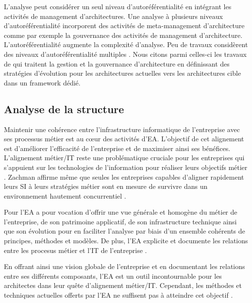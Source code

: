L'analyse peut considérer un seul niveau d'autoréférentialité en intégrant les
activités de management d'architectures. Une analyse à plusieurs niveaux
d'autoréférentialité incorporent des activités de meta-management
d'architecture comme par exemple la gouvernance des activités de management
d'architecture.  L'autoréférentialité augmente la complexité d'analyse. Peu de
travaux considèrent des niveaux d'autoréférentialité multiples
\cite{smook2014executable}. Nous citons parmi celles-ci les travaux de
\cite{metrailler_evolis_2014} qui traitent la gestion et la gouvernance
d'architecture en définissant des stratégies d'évolution pour les architectures
actuelles vers les architectures cible dans un framework dédié. 


\subsection{Analyse de la structure}

Maintenir une cohérence entre l'infrastructure informatique de l'entreprise
avec ses processus métier est au cœur des activités
d'EA\cite{lankhorst2013enterprise}. L'objectif de cet alignement est
d'améliorer l'efficacité de l'entreprise et de maximiser ainsi ses bénéfices.
L'alignement métier/IT reste une problématique cruciale pour les entreprises
qui s'appuient sur les technologies de l'information pour réaliser leurs
objectifs métier \cite{kaisler_enterprise_2005}. Zachman affirme même que
seules les entreprises capables d'aligner rapidement leurs SI à leurs
stratégies métier sont en mesure de survivre dans un environnement hautement
concurrentiel \cite{zachman1997enterprise}.
	
Pour \cite{lankhorst2013enterprise} l'EA a pour vocation d'offrir une vue
générale et homogène du métier de l'entreprise, de son patrimoine applicatif,
de son infrastructure technique ainsi que son évolution pour en faciliter
l'analyse par biais d'un ensemble cohérents de principes, méthodes et modèles.
De plus, l'EA explicite et documente les relations entre les procesus métier et
l'IT de l'entreprise \cite{kaisler_enterprise_2005}. 
	
En offrant ainsi une vision globale de l'entreprise et en documentant les
relations entre ses différents composants, l'EA est un outil incontournable
pour les architectes dans leur quête d'alignement métier/IT. Cependant, les
méthodes et techniques actuelles offerts par l'EA ne suffisent pas à atteindre
cet objectif \cite{barn2013enterprise}. 
	
